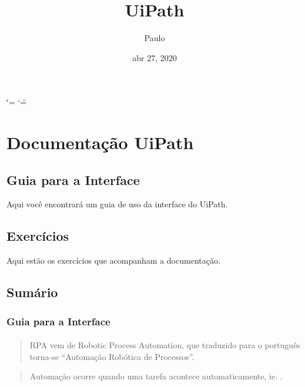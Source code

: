 \documentclass[letterpaper,10pt,brazil]{sphinxmanual}
\title{UiPath}
\date{abr 27, 2020}
\author{Paulo}
\begin{document}
\ifdefined\shorthandoff
  \ifnum\catcode`\=\string=\active\shorthandoff{=}\fi
  \ifnum\catcode`\"=\active{}\fi
\fi

\pagestyle{empty}
\sphinxmaketitle
\pagestyle{plain}
\sphinxtableofcontents
\pagestyle{normal}
\label{\detokenize{index::doc}}



\chapter{Documentação UiPath}
\label{\detokenize{index:documentacao-uipath}}

\section{Guia para a Interface}
\label{\detokenize{index:guia-para-a-interface}}
Aqui você encontrará um guia de uso da interface do UiPath.


\section{Exercícios}
\label{\detokenize{index:exercicios}}
Aqui estão os exercícios que acompanham a documentação.


\section{Sumário}
\label{\detokenize{index:sumario}}

\subsection{Guia para a Interface}
\label{\detokenize{interface_guide:guia-para-a-interface}}\label{\detokenize{interface_guide::doc}}

\subsubsection{}
\label{\detokenize{interface_guide:i-o-que-e-rpa}}\begin{quote}

RPA vem de Robotic Process Automation, que traduzido para o português torna-se “Automação Robótica de Processos”.
\end{quote}

\begin{quote}

Automação ocorre quando uma tarefa acontece automaticamente, ie. .
\end{quote}
\end{document}
